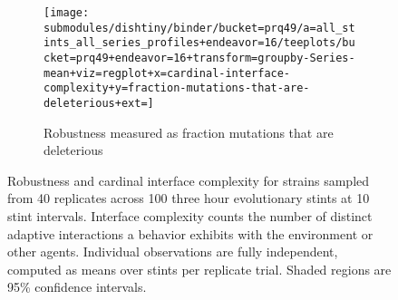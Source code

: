 \begin{figure}
\begin{center}

\begin{subfigure}[b]{\textwidth}
\centering
\texttt{[image: submodules/dishtiny/binder/bucket=prq49/a=all\_stints\_all\_series\_profiles+endeavor=16/teeplots/bucket=prq49+endeavor=16+transform=groupby-Series-mean+viz=regplot+x=cardinal-interface-complexity+y=fraction-mutations-that-are-deleterious+ext=]}%
\caption{
Robustness measured as fraction mutations that are deleterious
}
\label{fig:robustness-vs-cardinal-interface-complexity-fraction-mutations-that-are-deleterious}
\end{subfigure}

\caption{
Robustness and cardinal interface complexity for strains sampled from 40 replicates across 100 three hour evolutionary stints at 10 stint intervals.
Interface complexity counts the number of distinct adaptive interactions a behavior exhibits with the environment or other agents.
Individual observations are fully independent, computed as means over stints per replicate trial.
Shaded regions are 95\% confidence intervals.
}
\label{fig:robustness-vs-cardinal-interface-complexity}

\end{center}
\end{figure}
